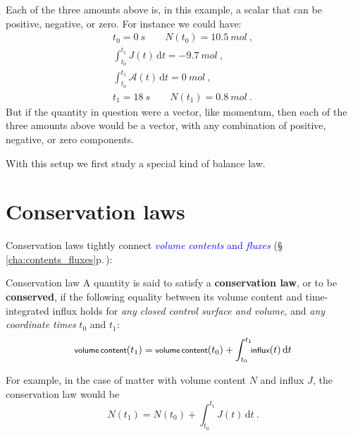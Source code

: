 \documentclass[a4paper,12pt,%
onecolumn,oneside,%
british%
]{memoir}
\renewcommand*{\bm}[1]{\textpdfrender{TextRenderingMode=2,LineWidth=0.2pt}{\boldsymbol{#1}}}
\newcommand*{\di}{\mathrm{d}}%
\renewcommand*{\|}[1][]{\nonscript\:#1\vert\nonscript\:\mathopen{}}
\newcommand*{\sect}{\S}%
\renewcommand*{\autoref}[3][\sect\,\ref]{\textcolor{blue}{#3} {\color{blue}\scriptsize(\faIcon[regular]{eye}\;#1{#2}\;p.\,\pageref{#2})}}
\newcommand*{\yti}{t_{0}}
\newcommand*{\ytf}{t_{1}}
\newcommand*{\dt}{\di t}
\newcommand*{\yN}{N}
\newcommand*{\yJ}{J}
\newcommand*{\ya}{\mathcal{A}}
\begin{document}
Each of the three amounts above is, in this example, a scalar that can be positive, negative, or zero. For instance we could have:
\begin{equation*}
  \begin{gathered}
    \yti = \qty{0}{s} \qquad \yN(\yti) = \qty{10.5}{mol}\ ,
    \\[1ex]
    \int_{\yti}^{\ytf}\!\!\yJ(t)\, \dt = \qty{-9.7}{mol} \ ,
    \\[1ex]
    \int_{\yti}^{\ytf}\!\!\ya(t)\, \dt = \qty{0}{mol} \ ,
    \\[1ex]
    \ytf = \qty{18}{s} \qquad \yN(\ytf) = \qty{0.8}{mol} \ .
  \end{gathered}
\end{equation*}
But if the quantity in question were a vector, like momentum, then each of the three amounts above would be a vector, with any combination of positive, negative, or zero components.


\medskip

With this setup we first study a special kind of balance law.

\section{Conservation laws}
\label{sec:conservation_laws}

Conservation laws tightly connect \autoref{cha:contents_fluxes}{\emph{volume contents} and \emph{fluxes}}:

\begin{definition}{Conservation law}
  A quantity is said to satisfy a \textbf{conservation law}, or to be \textbf{conserved}, if the following equality between its volume content and time-integrated influx holds for \emph{any closed control surface and volume}, and \emph{any coordinate times} $\yti$ and $\ytf$:
  \begin{equation}
    \label{eq:conserved}
    \textsf{\footnotesize volume\,content}(\ytf) =
    \textsf{\footnotesize volume\,content}(\yti) +
    \int_{\yti}^{\ytf}\!\!\textsf{\footnotesize influx}(t)\,\dt
  \end{equation}
\end{definition}
For example, in the case of matter with volume content $\yN$ and influx $\yJ$, the conservation law would be
\begin{equation*}
  \yN(\ytf) = \yN(\yti) + \int_{\yti}^{\ytf}\!\!\yJ(t)\, \dt \ .
\end{equation*}
\end{document}
